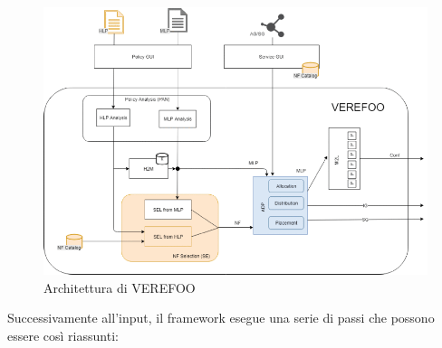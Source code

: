 \begin{figure}[h]  %
    \centering
    \includegraphics[width=1\textwidth]{VerefooArchitecture.png}  %
    \caption{Architettura di VEREFOO \cite{Bringhenti2019}}
    \label{fig:architettura_verefoo}
  \end{figure}

Successivamente all'input, il framework esegue una serie di passi che possono essere così riassunti:

